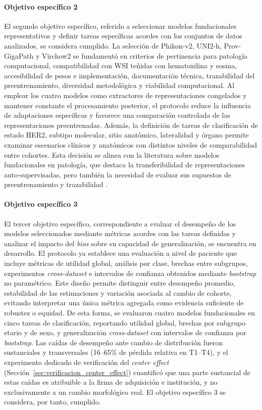 \paragraph{Objetivo específico 2} El segundo objetivo específico, referido a seleccionar modelos fundacionales representativos y definir tareas específicas acordes con los conjuntos de datos analizados, se considera cumplido. La selección de Phikon-v2, UNI2-h, Prov-GigaPath y Virchow2 se fundamentó en criterios de pertinencia para patología computacional, compatibilidad con WSI teñidas con hematoxilina y eosina, accesibilidad de pesos e implementación, documentación técnica, trazabilidad del preentrenamiento, diversidad metodológica y viabilidad computacional. Al emplear los cuatro modelos como extractores de representaciones congelados y mantener constante el procesamiento posterior, el protocolo reduce la influencia de adaptaciones específicas y favorece una comparación controlada de las representaciones preentrenadas. Además, la definición de tareas de clasificación de estado HER2, subtipo molecular, sitio anatómico, lateralidad y órgano permite examinar escenarios clínicos y anatómicos con distintos niveles de comparabilidad entre cohortes. Esta decisión se alinea con la literatura sobre modelos fundacionales en patología, que destaca la transferibilidad de representaciones auto-supervisadas, pero también la necesidad de evaluar sus supuestos de preentrenamiento y trazabilidad \parencite{chen2024uni,filiot2024phikonv2,xu2024provgigapath,vorontsov2024virchow}.

\paragraph{Objetivo específico 3} El tercer objetivo específico, correspondiente a evaluar el desempeño de los modelos seleccionados mediante métricas acordes con las tareas definidas y analizar el impacto del \textit{bias} sobre su capacidad de generalización, se encuentra en desarrollo. El protocolo ya establece una evaluación a nivel de paciente que incluye métricas de utilidad global, análisis por clase, brechas entre subgrupos, experimentos \textit{cross-dataset} e intervalos de confianza obtenidos mediante \textit{bootstrap} no paramétrico. Este diseño permite distinguir entre desempeño promedio, estabilidad de las estimaciones y variación asociada al cambio de cohorte, evitando interpretar una única métrica agregada como evidencia suficiente de robustez o equidad. De esta forma, se evaluaron cuatro modelos fundacionales en cinco tareas de clasificación, reportando utilidad global, brechas por subgrupo etario y de sexo, y generalización \textit{cross-dataset} con intervalos de confianza por \textit{bootstrap}. Las caídas de desempeño ante cambio de distribución fueron sustanciales y transversales (16--65\% de pérdida relativa en T1--T4), y el experimento dedicado de verificación del \textit{center effect} (Sección~\ref{sec:verificacion_center_effect}) cuantificó que una parte sustancial de estas caídas es atribuible a la firma de adquisición e institución, y no exclusivamente a un cambio morfológico real. El objetivo específico 3 se considera, por tanto, cumplido.

